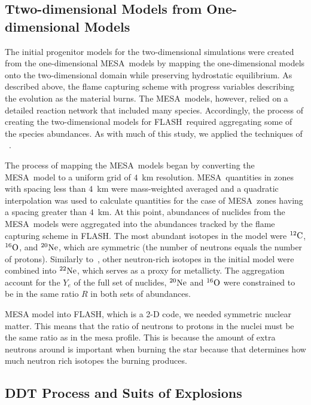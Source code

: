 \documentclass[iop,apj]{emulateapj}
\newcommand{\C}[1]{\ensuremath{{}^{#1}{\rm C}}}
\newcommand{\Ox}[1]{\ensuremath{{}^{#1}{\rm O}}}
\newcommand{\Ne}[1]{\ensuremath{{}^{#1}{\rm Ne}}}
\newcommand{\code}[1]{\textsc{#1}}
\newcommand{\FLASH}{\code{FLASH}}
\newcommand{\MESA}{\code{MESA}}
\begin{document}
\subsection{Ttwo-dimensional Models from One-dimensional Models}

The initial progenitor models for the two-dimensional simulations were
created from the one-dimensional \MESA\ models by mapping the one-dimensional
models onto the two-dimensional domain while 
preserving hydrostatic equilibrium.
As described above, the flame capturing scheme with progress
variables describing the evolution as the material burns. The \MESA\
models, however, relied on a detailed reaction network that included
many species. Accordingly, the process of creating the two-dimensional
models for \FLASH\ required aggregating some of the species abundances.
As with much of this study, we applied the 
techniques of ~\citet{willcoxetal2016}.


The process of mapping the \MESA\ models began by converting 
the \MESA\ model to a uniform grid of $4$~km resolution. \MESA\ 
quantities in zones with spacing less than $4$~km 
were mass-weighted averaged and a quadratic interpolation
was used to calculate quantities for the case of \MESA\ zones having
a spacing greater than $4$~km. At this point, 
abundances of nuclides from the \MESA\ models were aggregated
into the abundances tracked by the flame capturing scheme in
\FLASH.
The most abundant isotopes in the model were \C{12}, \Ox{16},
and \Ne{20}, which are symmetric (the number of neutrons 
equals the number of protons). Similarly to~\citet{willcoxetal2016}, 
other neutron-rich isotopes in the initial model were combined into 
\Ne{22}, which serves as a proxy for metallicty. The aggregation
account for the $Y_e$ of the full set of nuclides, \Ne{20} 
and \Ox{16} were constrained to be in the same ratio $R$ in both 
sets of abundances. 


MESA model into FLASH, which is a 2-D code, we needed symmetric nuclear
matter. This means that the ratio of neutrons to protons in the nuclei
must be the same ratio as in the mesa profile. This is because the amount
of extra neutrons around is important when burning the star because that
determines how much neutron rich isotopes the burning produces.

\subsection{DDT Process and Suits of Explosions}
\end{document}
